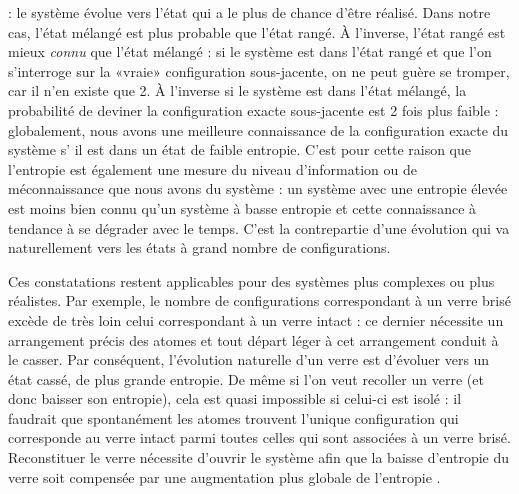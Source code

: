  : le système évolue vers l'état qui a le plus de chance d'être réalisé. Dans notre cas, l'état mélangé est plus probable que l'état rangé. À l'inverse, l'état rangé est mieux \textit{connu} que l'état mélangé : si le système est dans l'état rangé et que l'on s'interroge sur la «vraie» configuration sous-jacente, on ne peut guère se tromper, car il n'en existe que 2. À l'inverse si le système est dans l'état mélangé, la probabilité de deviner la configuration exacte sous-jacente est 2 fois plus faible : globalement, nous avons une meilleure connaissance de la configuration exacte du système s’ il est dans un état de faible entropie. C'est pour cette raison que l'entropie est également une mesure du niveau d'information ou de méconnaissance que nous avons du système : un système avec une entropie élevée est moins bien connu qu'un système à basse entropie et cette connaissance à tendance à se dégrader avec le temps. C'est la contrepartie d'une évolution qui va naturellement vers les états à grand nombre de configurations.

Ces constatations restent applicables pour des systèmes plus complexes ou plus réalistes. Par exemple, le nombre de configurations correspondant à un verre brisé excède de très loin celui correspondant à un verre intact : ce dernier nécessite un arrangement précis des atomes et tout départ léger à cet arrangement conduit à le casser. Par conséquent, l'évolution naturelle d'un verre est d'évoluer vers un état cassé, de plus grande entropie. De même si l'on veut recoller un verre (et donc baisser son entropie), cela est quasi impossible si celui-ci est isolé : il faudrait que spontanément les atomes trouvent l'unique configuration qui corresponde au verre intact parmi toutes celles qui sont associées à un verre brisé. Reconstituer le verre nécessite d'ouvrir le système afin que la baisse d'entropie du verre soit compensée par une augmentation plus globale de l'entropie . 

